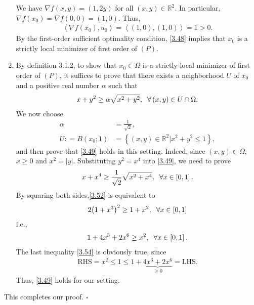 \documentclass[a4paper]{article}
\numberwithin{equation}{section}
\begin{document}
\begin{enumerate}
We have $\nabla f\left( {x,y} \right) = \left( {1,2y} \right)$ for all $\left( {x,y} \right) \in {\mathbb{R}^2}$. In particular, $\nabla f\left( {{x_0}} \right) = \nabla f\left( {0,0} \right) = \left( {1,0} \right)$. Thus,
\begin{align}
\label{3.48}
\left\langle {\nabla f\left( {{x_0}} \right),{u_0}} \right\rangle  = \left\langle {\left( {1,0} \right),\left( {1,0} \right)} \right\rangle  = 1 > 0.
\end{align}
By the first-order sufficient optimality condition, \eqref{3.48} implies that $x_0$ is a strictly local minimizer of first order of $\left(P\right)$.
\item By definition 3.1.2, to show that $x_0\in \Omega$ is a strictly local minimizer of first order of $\left(P\right)$, it suffices to prove that there exists a neighborhood $U$ of $x_0$ and a positive real number $\alpha$ such that
\begin{align}
\label{3.49}
x + {y^2} \ge \alpha \sqrt {{x^2} + {y^2}} ,\hspace{0.2cm}\forall \left(x,y\right) \in U \cap \Omega .
\end{align}
We now choose 
\begin{align}
\alpha  &= \frac{1}{\sqrt{2}},\\
U: = B\left( {{x_0};1} \right) &= \left\{ {\left( {x,y} \right) \in {\mathbb{R}^2}|{x^2} + {y^2} \le 1} \right\},
\end{align}
and then prove that \eqref{3.49} holds in this setting. Indeed, since $\left(x,y\right)\in \Omega$, $x\ge 0$ and ${x^2} = \left| y \right|$. Substituting $y^2=x^4$ into \eqref{3.49}, we need to prove
\begin{align}
\label{3.52}
x + {x^4} \ge \frac{1}{\sqrt{2}}\sqrt {{x^2} + {x^4}} ,\hspace{0.2cm}\forall x \in \left[ {0,1} \right].
\end{align}
By squaring both sides,\eqref{3.52} is equivalent to
\begin{align}
2{\left( {1 + {x^3}} \right)^2} \ge 1 + {x^2},\hspace{0.2cm}\forall x \in \left[ {0,1} \right]
\end{align}
i.e.,
\begin{align}
\label{3.54}
1 + 4{x^3} + 2{x^6} \ge {x^2},\hspace{0.2cm}\forall x \in \left[ {0,1} \right].
\end{align}
The last inequality \eqref{3.54} is obviously true, since 
\begin{align}
\mbox{RHS} = {x^2} \le 1 \le 1 + \underbrace {4{x^3} + 2{x^6}}_{ \ge 0} = \mbox{LHS}.
\end{align}
Thus, \eqref{3.49} holds for our setting. 
\end{enumerate}
This completes our proof. \hfill $\square$\\
\end{document}
